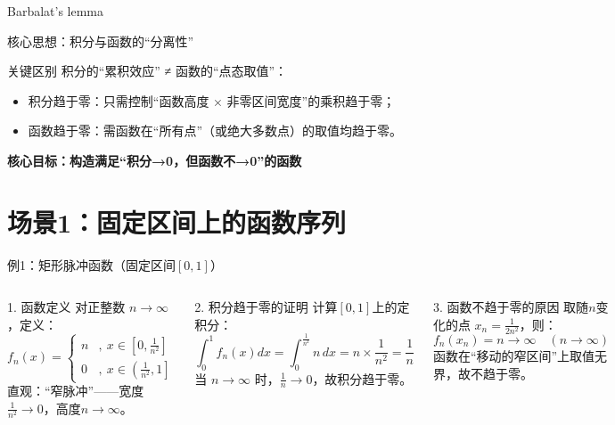 \begin{frame}{Barbalat's lemma}
    
\end{frame}

\begin{frame}{核心思想：积分与函数的“分离性”}
  \begin{block}{关键区别}
    积分的“累积效应” ≠ 函数的“点态取值”：
    \begin{itemize}
      \item 积分趋于零：只需控制“函数高度 × 非零区间宽度”的乘积趋于零；
      \item 函数趋于零：需函数在“所有点”（或绝大多数点）的取值均趋于零。
    \end{itemize}
  \end{block}

  \vspace{0.5cm}
  \begin{center}
    \textbf{核心目标：构造满足“积分→0，但函数不→0”的函数}
  \end{center}
\end{frame}

\section{场景1：固定区间上的函数序列}
\begin{frame}{例1：矩形脉冲函数（固定区间$[0,1]$）}
  \begin{columns}
    \begin{block}{1. 函数定义}
      对正整数 $n \to \infty$，定义：
      \[
      f_n(x) = 
      \begin{cases} 
      n & ,\ x \in \left[0, \frac{1}{n^2}\right] \\
      0 & ,\ x \in \left(\frac{1}{n^2}, 1\right]
      \end{cases}
      \]
      直观：“窄脉冲”——宽度$\frac{1}{n^2} \to 0$，高度$n \to \infty$。
    \end{block}

    \begin{block}{2. 积分趋于零的证明}
      计算$[0,1]$上的定积分：
      \[
      \int_0^1 f_n(x) dx = \int_0^{\frac{1}{n^2}} n \, dx = n \times \frac{1}{n^2} = \frac{1}{n}
      \]
      当 $n \to \infty$ 时，$\frac{1}{n} \to 0$，故积分趋于零。
    \end{block}

    \begin{block}{3. 函数不趋于零的原因}
      取随$n$变化的点 $x_n = \frac{1}{2n^2}$，则：
      \[
      f_n(x_n) = n \to \infty \quad (n \to \infty)
      \]
      函数在“移动的窄区间”上取值无界，故不趋于零。
    \end{block}
  \end{columns}
\end{frame}

